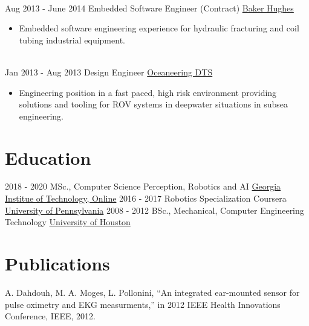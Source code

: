 \documentclass[letterpaper]{twentysecondcv} %
\begin{document}
\begin{twenty}
				\\
				\twentyitem
				{Aug 2013 -}
				{June 2014}
				{Embedded Software Engineer (Contract)}
				{\href{https://www.bakerhughes.com/}{Baker Hughes}}
				{}
				{
					\begin{itemize}
						\item Embedded software engineering experience for hydraulic fracturing and coil tubing industrial equipment. 
					\end{itemize}
				}
				\\
				\twentyitem
				{Jan 2013 -}
				{Aug 2013}
				{Design Engineer}
				{\href{https://www.oceaneering.com/intervention-tooling/}{Oceaneering DTS}}
				{}
				{
					\begin{itemize}
						\item Engineering position in a fast paced, high risk environment providing solutions and tooling for ROV systems in deepwater situations in subsea engineering.
					\end{itemize}
				}
				
				
			\end{twenty}


\section{Education}

\begin{twenty} %
	\twentyitem
    	{2018 - 2020}
        {}
        {MSc., Computer Science \textnormal{Perception, Robotics and AI}}
        {\href{http://www.omscs.gatech.edu/}{Georgia Institue of Technology, Online}}
        {}
        {}
    \twentyitem
    {2016 - 2017}
    {}
    {Robotics Specialization \textnormal{Coursera}}
    {\href{https://www.coursera.org/specializations/robotics}{University of Pennsylvania}}
    {}
    {}
	\twentyitem
    	{2008 - 2012}
		{}
        {BSc., Mechanical, Computer Engineering Technology}
        {\href{http://www.uh.edu/}{University of Houston}}
        {}
        {}
\end{twenty}

\section{Publications}
A. Dahdouh, M. A. Moges, L. Pollonini, “An integrated ear-mounted sensor for pulse oximetry and EKG measurments,” in 2012 IEEE Health Innovations Conference, IEEE, 2012. 
\end{document}
